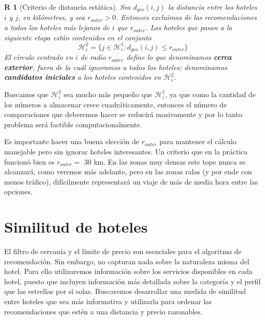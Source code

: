 \documentclass[12pt]{report}
\newcommand{\HH}{\mathcal{H}}
\newtheorem{regla}{R}%
\begin{document}
\begin{regla}[Criterio de distancia estática] \label{r:distanciaestatica}
Sea $d_{geo}(i,j)$ la distancia entre los hoteles $i$ y $j$, en kilómetros, y sea $r_{outer} > 0$. Entonces excluimos de las recomendaciones a todos los hoteles más lejanos de $i$ que $r_{outer}$. Los hoteles que pasan a la siguiente etapa están contenidos en el conjunto
\[
\HH_i^2 = \{j \in \HH_i^1 : d_{geo}(i,j) \leq r_{outer}\}
\]
El círculo centrado en $i$ de radio $r_{outer}$ define lo que denominamos \textbf{cerca exterior}, fuera de la cuál ignoramos a todos los hoteles; denominamos \textbf{candidatos iniciales} a los hoteles contenidos en $\HH_i^2$.
\end{regla}
Buscamos que $\HH_i^2$ sea mucho más pequeño que $\HH_i^1$, ya que como la cantidad de los números a almacenar crece cuadráticamente, entonces el número de comparaciones que deberemos hacer se reducirá masivamente y por lo tanto problema será factible computacionalmente.

Es importante hacer una buena elección de $r_{outer}$ para mantener el cálculo manejable pero sin ignorar hoteles interesantes. Un criterio que en la práctica funcionó bien es $r_{outer} =$ 30 km. En las zonas muy densas este tope nunca se alcanzará, como veremos más adelante, pero en las zonas ralas (y por ende con menos tráfico), difícilmente representará un viaje de más de media hora entre las opciones.

\section{Similitud de hoteles}

El filtro de cercanía y el límite de precio son esenciales para el algoritmo de recomendación. Sin embargo, no capturan nada sobre la naturaleza misma del hotel. Para ello utilizaremos información sobre los servicios disponibles en cada hotel, puesto que incluyen información más detallada sobre la categoría y el perfil que las estrellas por sí solas. Buscaremos desarrollar una medida de similitud entre hoteles que sea más informativa y utilizarla para ordenar las recomendaciones que estén a una distancia y precio razonables.
\end{document}
